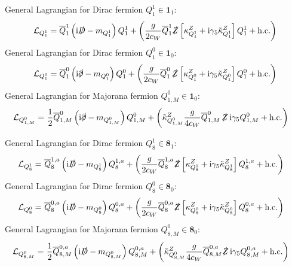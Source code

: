 \documentclass[preprintnumbers,nofootinbib,showpacs,eqsecnum,pre,12pt]{revtex4-1}
\newcommand{\adj}[1]{\overline{#1}}
\newcommand{\hc}{\text{h.c.}}
\begin{document}
\noindent
General Lagrangian for Dirac fermion $Q_1^1\in \mathbf 1_{1}$: 
\begin{align}\label{eq:LQ11}
	\mathcal L_{Q_1^1} =\adj Q_1^1 \left(\mathrm i \slashed D - m_{Q_1^1}\right) Q_1^1 + \left(\frac{g}{2c_W} \adj Q_1^1 \slashed Z \left[ \kappa_{Q_1^1}^{Z} + \mathrm i \gamma_5 \tilde\kappa_{Q_1^1}^{Z} \right] Q_1^1 +\hc\right)
\end{align}
General Lagrangian for Dirac fermion $Q_1^0\in \mathbf 1_{0}$: 
\begin{align}
	\mathcal L_{Q_1^0} = \adj Q_1^0 \left(\mathrm i \slashed \partial - m_{Q_1^0}\right) Q_1^0 +\left( \frac{g}{2c_W} \adj Q_1^0 \,\slashed Z \left[ \kappa_{Q_1^0}^{Z} + \mathrm i \gamma_5 \tilde\kappa_{Q_1^0}^{Z} \right] Q_1^0  +\hc\right)
\end{align}
General Lagrangian for Majorana fermion $Q_{1,M}^0\in \mathbf 1_{0}$: 
\begin{align}
	\mathcal L_{Q_{1,M}^0} =~ &\frac 12 \adj Q_{1,M}^0 \left(\mathrm i \slashed \partial - m_{Q_{1,M}^0}\right) Q_{1,M}^0 + \left(\tilde\kappa_{Q_{1,M}^0}^Z\frac{g}{4c_W} \adj Q_{1,M}^0 \,\slashed Z\,  \mathrm i \gamma_5 Q_{1,M}^0  +\hc\right)
\end{align}



\noindent
General Lagrangian for Dirac fermion $Q_8^1\in \mathbf 8_{1}$: 
\begin{align}
	\mathcal L_{Q_8^1} =~ &\adj Q_8^{1,a} \left(\mathrm i \slashed D - m_{Q_8^{1}}\right) Q_8^{1,a} +\left( \frac{g}{2c_W} \adj Q_8^{1,a} \slashed Z \left[ \kappa_{Q_8^{1}}^{Z} + \mathrm i \gamma_5 \tilde\kappa_{Q_8^{1}}^{Z} \right] Q_8^{1,a}  +\hc\right)
\end{align}
General Lagrangian for Dirac fermion $Q_8^0\in \mathbf 8_{0}$: 
\begin{align}
	\mathcal L_{Q_8^0} =~ &\adj Q_8^{0,a} \left(\mathrm i \slashed D - m_{Q_8^{0}}\right) Q_8^{0,a}  +\left( \frac{g}{2c_W} \adj Q_8^{0,a} \slashed Z \left[ \kappa_{Q_8^{0}}^{Z} + \mathrm i \gamma_5 \tilde\kappa_{Q_8^{0}}^{Z} \right] Q_8^{0,a}  +\hc\right)
\end{align}
General Lagrangian for Majorana fermion $Q_{8,M}^0\in \mathbf 8_{0}$: 
\begin{align}\label{eq:LQ80M}
	\mathcal L_{Q_{8,M}^0} =~ &\frac 12 \adj Q_{8,M}^{0,a} \left(\mathrm i \slashed D - m_{Q_{8,M}^{0}}\right) Q_{8,M}^{0,a} + \left(\tilde\kappa_{Q_{8,M}^{0}}^{Z}  \frac{g}{4c_W} \adj Q_{8,M}^{0,a} \slashed Z \, \mathrm i \gamma_5  Q_{8,M}^{0,a}  +\hc\right)
\end{align}
\end{document}
